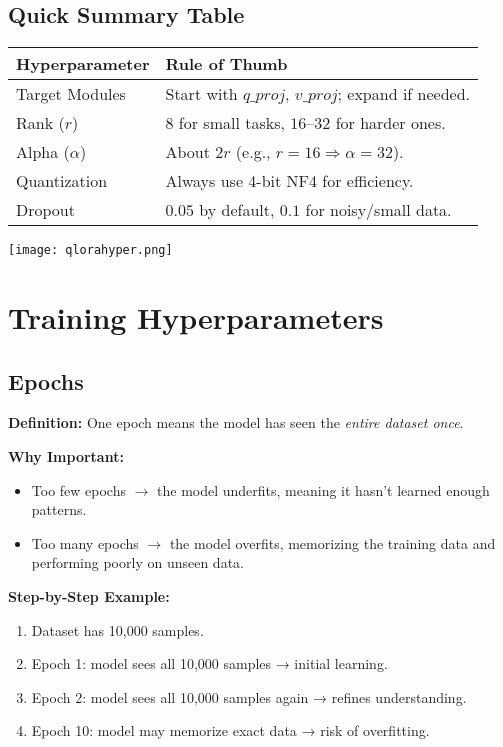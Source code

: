 \subsection{Quick Summary Table}
\begin{center}
\begin{tabular}{|p{5cm}|p{9cm}|}
\hline
\textbf{Hyperparameter} & \textbf{Rule of Thumb} \\
\hline
Target Modules & Start with $q\_proj$, $v\_proj$; expand if needed. \\
\hline
Rank ($r$) & $8$ for small tasks, $16$–$32$ for harder ones. \\
\hline
Alpha ($\alpha$) & About $2r$ (e.g., $r=16 \Rightarrow \alpha=32$). \\
\hline
Quantization & Always use 4-bit NF4 for efficiency. \\
\hline
Dropout & $0.05$ by default, $0.1$ for noisy/small data. \\
\hline
\end{tabular}
\end{center}

\texttt{[image: qlorahyper.png]}

\newpage


\section{Training Hyperparameters}

\subsection{Epochs}
\textbf{Definition:} One epoch means the model has seen the \textit{entire dataset once}.  

\textbf{Why Important:} 
\begin{itemize}
    \item Too few epochs $\rightarrow$ the model underfits, meaning it hasn’t learned enough patterns.  
    \item Too many epochs $\rightarrow$ the model overfits, memorizing the training data and performing poorly on unseen data.  
\end{itemize}

\textbf{Step-by-Step Example:}
\begin{enumerate}
    \item Dataset has 10,000 samples.  
    \item Epoch 1: model sees all 10,000 samples → initial learning.  
    \item Epoch 2: model sees all 10,000 samples again → refines understanding.  
    \item Epoch 10: model may memorize exact data → risk of overfitting.  
\end{enumerate}

